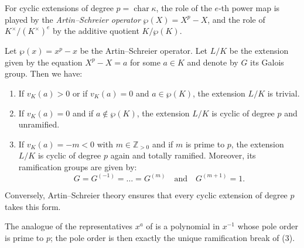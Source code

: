 For cyclic extensions of degree $p = \operatorname{char} \kappa$, the role of
the $e$-th power map is played by the \emph{Artin--Schreier operator}
$\wp(X) = X^p - X$, and the role of $K^\times/(K^\times)^e$ by the additive
quotient $K/\wp(K)$.

\begin{theorem}\label{theorem:artin_schreier_ramification}
Let $\wp(x) = x^p - x$ be the Artin--Schreier operator.
Let $L/K$ be the extension given by the equation $X^p - X = a$ for some $a \in K$ and denote by $G$ its Galois group.
Then we have:
\begin{enumerate}
    \item If $v_K(a) > 0$ or if $v_K(a) = 0$ and $a \in \wp(K)$, the extension $L/K$ is trivial.
    \item If $v_K(a) = 0$ and if $a \notin \wp(K)$, the extension $L/K$ is cyclic of degree $p$ and unramified.
    \item If $v_K(a) = -m < 0$ with $m \in \mathbb{Z}_{>0}$ and if $m$ is prime to $p$, the extension $L/K$ is cyclic of degree $p$ again and totally ramified. Moreover,
     its ramification groups are given by:
     $$G = G^{(-1)} = \dots = G^{(m)} \quad \text{and} \quad G^{(m+1)} = 1.$$
\end{enumerate}
Conversely, Artin--Schreier theory ensures that every cyclic extension of degree $p$ takes this form.
\end{theorem}

The analogue of the representatives $x^a$ of
 is a polynomial in $x^{-1}$ whose
pole order is prime to $p$; the pole order is then exactly the unique
ramification break of (3).

